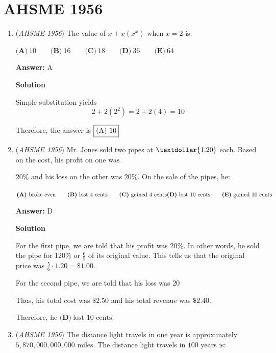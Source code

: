\section{AHSME 1956}
        \begin{enumerate}
        	\item (\textit{AHSME 1956}) The value of $x + x(x^x)$ when $x = 2$ is: 


 $\textbf{(A)}\ 10 \qquad\textbf{(B)}\ 16 \qquad\textbf{(C)}\ 18 \qquad\textbf{(D)}\ 36 \qquad\textbf{(E)}\ 64$

 \textbf{Answer: }A



\textbf{Solution}

Simple substitution yields
 \[2 + 2(2^2) = 2 + 2(4) = 10\]

 Therefore, the answer is $\fbox{(A) 10}$



	\item (\textit{AHSME 1956}) Mr. Jones sold two pipes at $\textdollar{ 1.20}$ each. Based on the cost, his profit on one was


 $20$\% and his loss on the other was $20$\%. 
On the sale of the pipes, he: 


 $\textbf{(A)}\ \text{broke even}\qquad \textbf{(B)}\ \text{lost }4\text{ cents} \qquad\textbf{(C)}\ \text{gained }4\text{ cents}\qquad \\ \textbf{(D)}\ \text{lost }10\text{ cents}\qquad \textbf{(E)}\ \text{gained }10\text{ cents}$

 \textbf{Answer: }D



\textbf{Solution}

For the first pipe, we are told that his profit was 20\%. In other words, he sold the pipe for 120\% or $\frac{6}{5}$ of its original value. This tells us that the original price was $\frac{5}{6}\cdot1.20 = \$1.00$.

 For the second pipe, we are told that his loss was 20%

 
Thus, his total cost was $\$2.50$ and his total revenue was $\$2.40$.

 
Therefore, he $\boxed{\textbf{(D)}\ \text{lost }10\text{ cents}}$.

 


	\item (\textit{AHSME 1956}) The distance light travels in one year is approximately $5,870,000,000,000$ miles. The distance light travels in $100$ years is: 



\end{enumerate}
